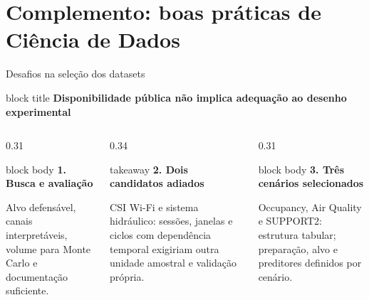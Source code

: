 
\backupbegin

\section{Complemento: boas práticas de Ciência de Dados}

\begin{frame}{Desafios na seleção dos datasets}
  \begin{beamercolorbox}[wd=\linewidth,sep=.12cm,rounded=true]{block title}
    \centering\sffamily\bfseries\fontsize{10.5}{12.6}\selectfont
    Disponibilidade pública não implica adequação ao desenho experimental
  \end{beamercolorbox}

  \vspace{.12cm}
  \begin{columns}[T,onlytextwidth]
    \begin{column}{0.31\textwidth}
      \begin{beamercolorbox}[wd=\linewidth,sep=.16cm,rounded=true]{block body}
        {\sffamily\bfseries\color{CoInfoBlue}1. Busca e avaliação}\par\vspace{.08cm}
        {\fontsize{8.5}{10.2}\selectfont
          Alvo defensável, canais interpretáveis, volume para Monte Carlo e documentação suficiente.}
      \end{beamercolorbox}
    \end{column}
    \begin{column}{0.34\textwidth}
      \begin{beamercolorbox}[wd=\linewidth,sep=.16cm,rounded=true]{takeaway}
        {\sffamily\bfseries\color{CoInfoRose}2. Dois candidatos adiados}\par\vspace{.08cm}
        {\fontsize{8.5}{10.2}\selectfont
          CSI Wi-Fi e sistema hidráulico: sessões, janelas e ciclos com dependência temporal exigiriam outra unidade amostral e validação própria.}
      \end{beamercolorbox}
    \end{column}
    \begin{column}{0.31\textwidth}
      \begin{beamercolorbox}[wd=\linewidth,sep=.16cm,rounded=true]{block body}
        {\sffamily\bfseries\color{CoInfoMint}3. Três cenários selecionados}\par\vspace{.08cm}
        {\fontsize{8.5}{10.2}\selectfont
          Occupancy, Air Quality e SUPPORT2: estrutura tabular; preparação, alvo e preditores definidos por cenário.}
      \end{beamercolorbox}
    \end{column}
  \end{columns}


\end{frame}
